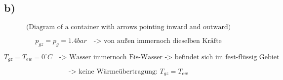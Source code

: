 

\subsection*{b)}

\[
\text{(Diagram of a container with arrows pointing inward and outward)}
\]

\[
p_{gz} = p_g = 1.4 bar \quad \text{-> von außen immernoch dieselben Kräfte}
\]

\[
T_{gz} = T_{ew} = 0^\circ C \quad \text{-> Wasser immernoch Eis-Wasser -> befindet sich im fest-flüssig Gebiet}
\]

\[
\text{-> keine Wärmeübertragung: } T_{gz} = T_{ew}
\]